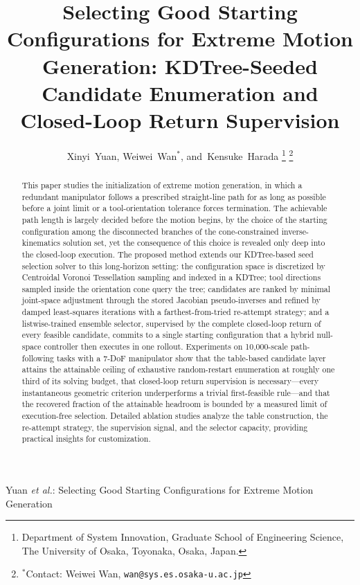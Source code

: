 \documentclass[journal]{IEEEtran}
\newcommand{\nSealed}{10{,}000}
\begin{document}
\title{Selecting Good Starting Configurations for Extreme Motion
Generation: KDTree-Seeded Candidate Enumeration and Closed-Loop Return
Supervision}

\author{Xinyi~Yuan, Weiwei~Wan$^{*}$, and~Kensuke~Harada%
\thanks{Department of System Innovation, Graduate School of Engineering
Science, The University of Osaka, Toyonaka, Osaka, Japan.}%
\thanks{$^{*}$Contact: Weiwei Wan, \texttt{wan@sys.es.osaka-u.ac.jp}}}

%
{Yuan \MakeLowercase{\textit{et al.}}: Selecting Good Starting
Configurations for Extreme Motion Generation}

\maketitle

\begin{abstract}
This paper studies the initialization of extreme motion generation, in
which a redundant manipulator follows a prescribed straight-line path for
as long as possible before a joint limit or a tool-orientation tolerance
forces termination. The achievable path length is largely decided before
the motion begins, by the choice of the starting configuration among the
disconnected branches of the cone-constrained inverse-kinematics solution
set, yet the consequence of this choice is revealed only deep into the
closed-loop execution. The proposed method extends our KDTree-based seed
selection solver to this long-horizon setting: the configuration space is
discretized by Centroidal Voronoi Tessellation sampling and indexed in a
KDTree; tool directions sampled inside the orientation cone query the
tree; candidates are ranked by minimal joint-space adjustment through the
stored Jacobian pseudo-inverses and refined by damped least-squares
iterations with a farthest-from-tried re-attempt strategy; and a
listwise-trained ensemble selector, supervised by the complete
closed-loop return of every feasible candidate, commits to a single
starting configuration that a hybrid null-space controller then executes
in one rollout. Experiments on \nSealed-scale path-following tasks with a
7-DoF manipulator show that the table-based candidate layer attains the
attainable ceiling of exhaustive random-restart enumeration at roughly
one third of its solving budget, that closed-loop return supervision is
necessary---every instantaneous geometric criterion underperforms a
trivial first-feasible rule---and that the recovered fraction of the
attainable headroom is bounded by a measured limit of execution-free
selection. Detailed ablation studies analyze the table construction, the
re-attempt strategy, the supervision signal, and the selector capacity,
providing practical insights for customization.
\end{abstract}
\end{document}

